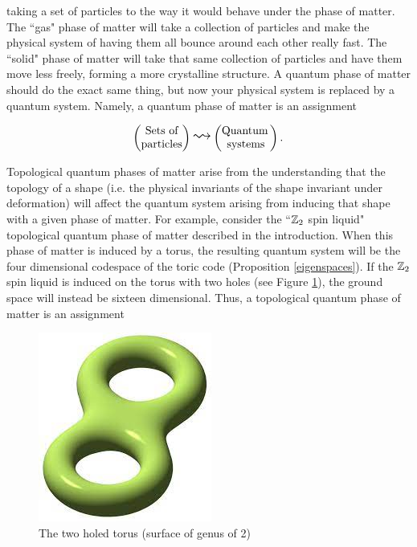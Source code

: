 \documentclass{article}
\theoremstyle{definition}
\numberwithin{figure}{section}
\begin{document}
taking a set of particles to the way it would behave under the phase of matter. The ``gas" phase of matter will take a collection of particles and make the physical system of having them all bounce around each other really fast. The ``solid" phase of matter will take that same collection of particles and have them move less freely, forming a more crystalline structure. A quantum phase of matter should do the exact same thing, but now your physical system is replaced by a quantum system. Namely, a quantum phase of matter is an assignment

$$
\begin{pmatrix}
\text{Sets of} \\
\text{particles}
\end{pmatrix}
\bigleadsto
\begin{pmatrix}
\text{Quantum\,} \\ \text{systems}
\end{pmatrix}.
$$

Topological quantum phases of matter arise from the understanding that the topology of a shape (i.e. the physical invariants of the shape invariant under deformation) will affect the quantum system arising from inducing that shape with a given phase of matter. For example, consider the ``$\mathbb{Z}_2$ spin liquid" topological quantum phase of matter described in the introduction. When this phase of matter is induced by a torus, the resulting quantum system will be the four dimensional codespace of the toric code (Proposition \ref{eigenspaces}). If the $\mathbb{Z}_2$ spin liquid is induced on the torus with two holes (see Figure \ref{fig:genus-two}), the ground space will instead be sixteen dimensional. Thus, a topological quantum phase of matter is an assignment

\begin{figure}
\begin{center}
\includegraphics[scale=0.25]{genus-two}
\caption{The two holed torus (surface of genus of 2)}
\label{fig:genus-two}
\end{center}
\end{figure}
\end{document}
